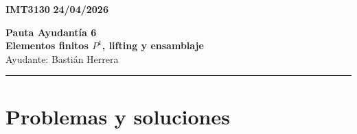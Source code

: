 \documentclass[11pt]{article}
\begin{document}
    \begin{flushleft}
        \small
        \vspace{1pt}
        \textbf{IMT3130} \hfill
        \textbf{24/04/2026}
    \end{flushleft}
    \begin{center}
        \LARGE\textbf{Pauta Ayudantía 6}\\
        \vspace{3pt}
        \normalsize\textbf{Elementos finitos $P^1$, lifting y ensamblaje}\\
        \normalsize Ayudante: Bastián Herrera 
        \rule{\textwidth}{0.05mm}
    \end{center}

\section*{Problemas y soluciones}
\end{document}
